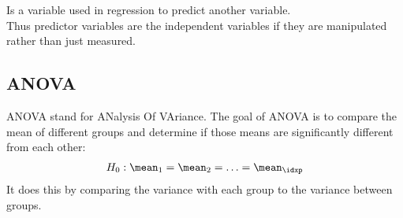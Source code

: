 \begin{defnbox}\nospacing
  \begin{defn}\label{defn:}
    Is a variable used in regression to predict another variable.\\
    Thus predictor variables are the independent variables if they are manipulated rather than just measured. 
  \end{defn}
\end{defnbox}
\begin{defnbox}\nospacing
  \begin{defn}\label{defn:}
  \end{defn}
\end{defnbox}
\subsection{ANOVA}
\label{subsubsec:ANOVA}
\begin{defnbox}\nospacing
  \begin{defn}[ANOVA]\label{defn:ANOVA}
  ANOVA stand for ANalysis Of VAriance.
  The goal of ANOVA is to compare the mean of different groups and determine
  if those means are significantly different from each other:
  \begin{align*}
    H_0: \mean_1=\mean_2=\ldots=\mean_{\idxp}
  \end{align*}
  It does this by comparing the variance with each group to the variance
  between groups.
  \end{defn}
\end{defnbox}
